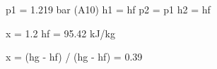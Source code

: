 p1 = 1.219 bar (A10)  
h1 = hf  
p2 = p1  
h2 = hf  

x = 1.2  
hf = 95.42 kJ/kg  

x = (hg - hf) / (hg - hf) = 0.39